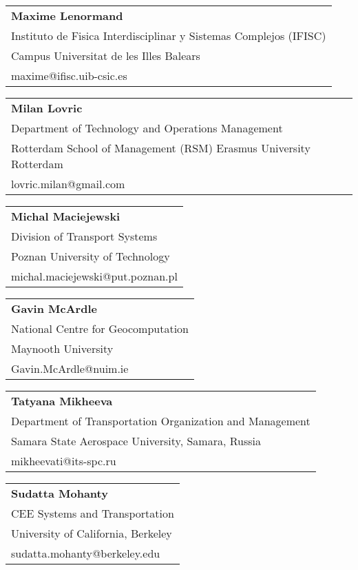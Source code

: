 \begin{tabular}[width=0.48\textwidth]{@{}l}
\textbf{Maxime Lenormand} \\
Instituto de Fisica Interdisciplinar y Sistemas Complejos (IFISC) \\
Campus Universitat de les Illes Balears \\
maxime@ifisc.uib-csic.es   \\
\end{tabular}

\begin{tabular}[width=0.48\textwidth]{@{}l}
\textbf{Milan Lovric} \\
Department of Technology and Operations Management \\
Rotterdam School of Management (RSM) Erasmus University Rotterdam \\
lovric.milan@gmail.com  \\
\end{tabular}

\begin{tabular}[width=0.48\textwidth]{@{}l}
\textbf{Michal Maciejewski} \\
Division of Transport Systems \\
Poznan University of Technology \\
michal.maciejewski@put.poznan.pl \\
\end{tabular}

\begin{tabular}[width=0.48\textwidth]{@{}l}
\textbf{Gavin McArdle} \\
National Centre for Geocomputation \\
Maynooth University \\
Gavin.McArdle@nuim.ie \\
\end{tabular}

\begin{tabular}[width=0.48\textwidth]{@{}l}
\textbf{Tatyana Mikheeva} \\
Department of Transportation Organization and Management \\
Samara State Aerospace University, Samara, Russia \\
mikheevati@its-spc.ru \\
\end{tabular}

\begin{tabular}[width=0.48\textwidth]{@{}l}
\textbf{Sudatta Mohanty} \\
CEE Systems and Transportation \\
University of California, Berkeley \\
sudatta.mohanty@berkeley.edu \\
\end{tabular}

